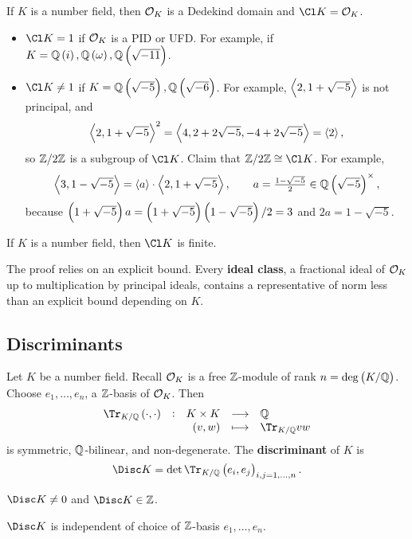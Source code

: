 If $ K $ is a number field, then $ \mathcal{O}_K $ is a Dedekind domain and $ \Cl K = \OOO_K $.

\begin{example*}
\hfill
\begin{itemize}
\item $ \Cl K = 1 $ if $ \mathcal{O}_K $ is a PID or UFD. For example, if $ K = \QQ\br{i}, \QQ\br{\omega}, \QQ\br{\sqrt{-11}} $.
\item $ \Cl K \ne 1 $ if $ K = \QQ\br{\sqrt{-5}}, \QQ\br{\sqrt{-6}} $. For example, $ \left\langle 2, 1 + \sqrt{-5} \right\rangle $ is not principal, and
$$ \left\langle 2, 1 + \sqrt{-5} \right\rangle^2 = \left\langle 4, 2 + 2\sqrt{-5}, -4 + 2\sqrt{-5} \right\rangle = \left\langle 2 \right\rangle, $$
so $ \mathbb{Z} / 2\mathbb{Z} $ is a subgroup of $ \Cl K $. Claim that $ \ZZ / 2\ZZ \cong \Cl K $. For example,
$$ \abr{3, 1 - \sqrt{-5}} = \abr{a} \cdot \abr{2, 1 + \sqrt{-5}}, \qquad a = \tfrac{1 - \sqrt{-5}}{2} \in \QQ\br{\sqrt{-5}}^\times, $$
because $ \br{1 + \sqrt{-5}}a = \br{1 + \sqrt{-5}}\br{1 - \sqrt{-5}} / 2 = 3 $ and $ 2a = 1 - \sqrt{-5} $.
\end{itemize}
\end{example*}

\begin{theorem}
If $ K $ is a number field, then $ \Cl K $ is finite.
\end{theorem}

The proof relies on an explicit bound. Every \textbf{ideal class}, a fractional ideal of $ \mathcal{O}_K $ up to multiplication by principal ideals, contains a representative of norm less than an explicit bound depending on $ K $.

\subsection{Discriminants}

Let $ K $ be a number field. Recall $ \mathcal{O}_K $ is a free $ \mathbb{Z} $-module of rank $ n = \deg \br{K / \QQ} $. Choose $ e_1, \dots, e_n $, a $ \mathbb{Z} $-basis of $ \mathcal{O}_K $. Then
$$ \function[\Tr_{K / \QQ}\br{\cdot, \cdot}]{K \times K}{\QQ}{\br{v, w}}{\Tr_{K / \QQ} vw} $$
is symmetric, $ \mathbb{Q} $-bilinear, and non-degenerate. The \textbf{discriminant} of $ K $ is
$$ \Disc K = \det \Tr_{K / \QQ}\br{e_i, e_j}_{i, j = 1, \dots, n}. $$

\begin{remark*}
$ \Disc K \ne 0 $ and $ \Disc K \in \ZZ $.
\end{remark*}

\pagebreak

\begin{lemma}
$ \Disc K $ is independent of choice of $ \mathbb{Z} $-basis $ e_1, \dots, e_n $.
\end{lemma}


